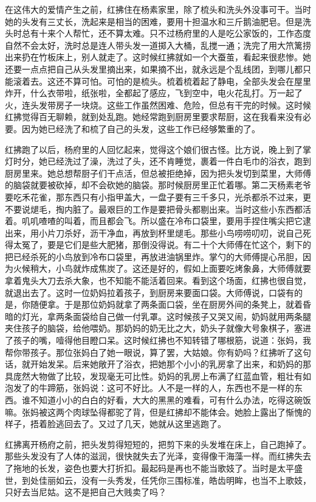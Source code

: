 在这伟大的爱情产生之前，红拂住在杨素家里，除了梳头和洗头外没事可干。当时她的头发有三丈长，洗起来是相当的困难，要用十担温水和三斤鹅油肥皂。但是洗头时总有十来个人帮忙，还不算太难。只不过杨府里的人是吃公家饭的，工作态度自然不会太好，洗时总是连人带头发一道掷入大桶，乱搅一通；洗完了用大笊篱捞出来扔在竹板床上，别人就走了。这时候红拂就如一个大蚕茧，看起来很悲惨。她还要一点点把自己从头发里摘出来，如果摘不出，就永远是个乱线团，到哪儿都只能滚着去。这还不算可怕。可怕的是梳头。梳着梳着起了静电，全部头发会在屋里炸开，什么衣带啦，纸张啦，全都起了感应，飞到空中，电火花乱打。万一起了火，连头发带房子一块烧。这些工作虽然困难、危险，但总有干完的时候。这时候红拂觉得百无聊赖，就到处乱跑。她经常跑到厨房里要求帮厨，这在我看来没有必要。因为她已经洗了和梳了自己的头发，这些工作已经够繁重的了。 

红拂跑了以后，杨府里的人回忆起来，觉得这个娘们很古怪。比方说，晚上到了掌灯时分，她已经洗过了澡，洗过了头，还不肯睡觉，裹着一件白毛巾的浴衣，跑到厨房里来。她总想帮厨子们干点活，但总被拒绝掉，因为把头发切到菜里，大师傅的脑袋就要被砍掉，却不会砍她的脑袋。那时候厨房里正忙着哪。第二天杨素老爷要吃禾花雀，那东西只有小指甲盖大，一盘子要有三千多只，光杀都杀不过来，更不要说煺毛，掏内脏了。最艰巨的工作是要把骨头都剔出来。当时这些小东西都活着。叽叽喳喳的叫着，而且都会飞。所以盛在冷布口袋里，要用手捏住嘴尖把它逮出来，用小片刀杀好，沥干净血，再放到杯里煺毛。那些小鸟唠唠叨叨，说自己死得太冤了，要是它们是些大肥猪，那倒没得说。有二十个大师傅在忙这个，剩下的把已经杀死的小鸟放到冷布口袋里，再放进油锅里炸。掌勺的大师傅提心吊胆，因为火候稍大，小鸟就炸成焦炭了。这还是好的，假如上面要吃烤象鼻，大师傅就要拿着鬼头大刀去杀大象，也不知能不能活着回来。看到这个场面，红拂也很自觉，就退出去了。这时一位奶妈拉着孩子，到厨房来要面口袋。大师傅说，口袋有的是，你随便拿。于是那位奶妈就拿了两条面口袋，坐在厨房外间的条凳上，就着昏暗的灯光，拿两条面袋给自己做一付乳罩。这时候孩子又哭又闹，奶妈就用两条腿夹住孩子的脑袋，给他喂奶。那奶妈的奶无比之大，奶头子就像大号象棋子，塞进了孩子的嘴，噎得他目瞪口呆。这时候红拂也不知转错了哪根筋，说道：张妈，我帮你带孩子。那位张妈白了她一眼说，算了罢，大姑娘。你有奶吗？红拂听了这句话，就开始发呆。后来她敞开了浴衣，把她那个小小的乳房拿了出来，和奶妈的那具庞然大物做了比较，发现毫无可比性。奶妈的乳房上布满了红蓝血管，粗壮有如泡发了的牛蹄筋，张妈说：这可不好比。人不是一样的人，东西也不是一样的东西。谁不知道小小的白白的好看，大大的黑黑的难看，可有什么办法，吃得这碗饭嘛。张妈被这两个肉球坠得都驼了背，但是红拂却不能体会。她脸上露出了惭愧的样子，捂着脸逃回去了。又过了几天，她就从这里逃跑了。 

红拂离开杨府之前，把头发剪得短短的，把剪下来的头发堆在床上，自己跑掉了。那些头发没有了人体的滋润，很快就失去了光泽，变得像干海藻一样。而红拂失去了拖地的长发，姿色也要大打折扣。最起码是再也不能当歌妓了。当时是太平盛世，到处佳丽如云，没有一头秀发，任凭你三围标准，皓齿明眸，也当不上歌妓，只好去当尼姑。这不是把自己大贱卖了吗？ 


